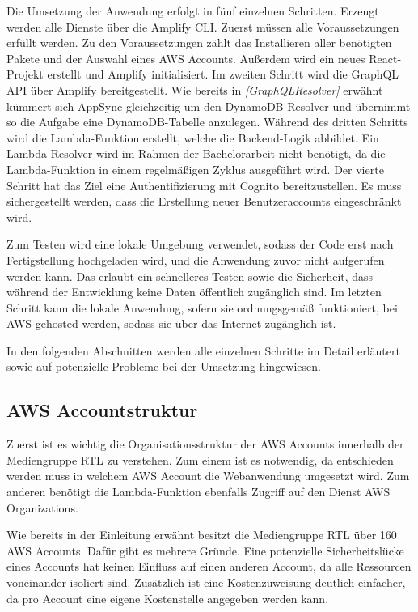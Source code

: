 Die Umsetzung der Anwendung erfolgt in fünf einzelnen Schritten.
Erzeugt werden alle Dienste über die Amplify CLI.
Zuerst müssen alle Voraussetzungen erfüllt werden.
Zu den Voraussetzungen zählt das Installieren aller benötigten Pakete und der Auswahl eines AWS Accounts.
Außerdem wird ein neues React-Projekt erstellt und Amplify initialisiert.
Im zweiten Schritt wird die GraphQL API über Amplify bereitgestellt.
Wie bereits in \textit{\ref{GraphQLResolver} } erwähnt kümmert sich AppSync gleichzeitig um den DynamoDB-Resolver und übernimmt so die Aufgabe eine DynamoDB-Tabelle anzulegen.
Während des dritten Schritts wird die Lambda-Funktion erstellt, welche die Backend-Logik abbildet.
Ein Lambda-Resolver wird im Rahmen der Bachelorarbeit nicht benötigt, da die Lambda-Funktion in einem regelmäßigen Zyklus ausgeführt wird.
Der vierte Schritt hat das Ziel eine Authentifizierung mit Cognito bereitzustellen.
Es muss sichergestellt werden, dass die Erstellung neuer Benutzeraccounts eingeschränkt wird.

Zum Testen wird eine lokale Umgebung verwendet, sodass der Code erst nach Fertigstellung hochgeladen wird, und die Anwendung zuvor nicht aufgerufen werden kann.
Das erlaubt ein schnelleres Testen sowie die Sicherheit, dass während der Entwicklung keine Daten öffentlich zugänglich sind.
Im letzten Schritt kann die lokale Anwendung, sofern sie ordnungsgemäß funktioniert, bei AWS gehosted werden, sodass sie über das Internet zugänglich ist.


In den folgenden Abschnitten werden alle einzelnen Schritte im Detail erläutert sowie auf potenzielle Probleme bei der Umsetzung hingewiesen.

\subsection{AWS Accountstruktur }
\label{Accountstruktur}

Zuerst ist es wichtig die Organisationsstruktur der AWS Accounts innerhalb der Mediengruppe RTL zu verstehen.
Zum einem ist es notwendig, da entschieden werden muss in welchem AWS Account die Webanwendung umgesetzt wird.
Zum anderen benötigt die Lambda-Funktion ebenfalls Zugriff auf den Dienst AWS Organizations.

Wie bereits in der Einleitung erwähnt besitzt die Mediengruppe RTL über 160 AWS Accounts.
Dafür gibt es mehrere Gründe.
Eine potenzielle Sicherheitslücke eines Accounts hat keinen Einfluss auf einen anderen Account, da alle Ressourcen voneinander isoliert sind.
Zusätzlich ist eine Kostenzuweisung deutlich einfacher, da pro Account eine eigene Kostenstelle angegeben werden kann.


